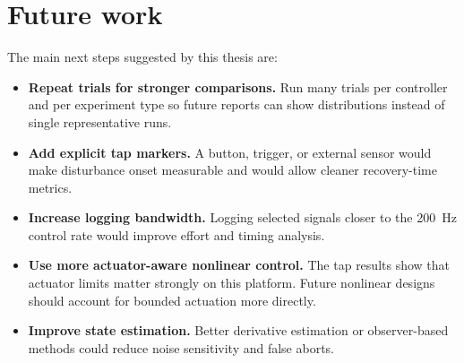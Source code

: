 \section{Future work}
The main next steps suggested by this thesis are:
\begin{itemize}
  \item \textbf{Repeat trials for stronger comparisons.} Run many trials per controller and per experiment type so future reports can show distributions instead of single representative runs.
  \item \textbf{Add explicit tap markers.} A button, trigger, or external sensor would make disturbance onset measurable and would allow cleaner recovery-time metrics.
  \item \textbf{Increase logging bandwidth.} Logging selected signals closer to the \SI{200}{Hz} control rate would improve effort and timing analysis.
  \item \textbf{Use more actuator-aware nonlinear control.} The tap results show that actuator limits matter strongly on this platform. Future nonlinear designs should account for bounded actuation more directly.
  \item \textbf{Improve state estimation.} Better derivative estimation or observer-based methods could reduce noise sensitivity and false aborts.
\end{itemize}
